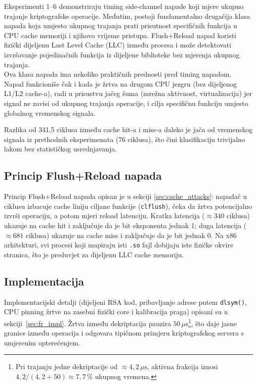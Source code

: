 Eksperimenti 1--6 demonstriraju timing side-channel napade koji mjere ukupno trajanje kriptografske operacije. Međutim, postoji fundamentalno drugačija klasa napada koja umjesto ukupnog trajanja prati prisutnost specifičnih funkcija u CPU cache memoriji i njihovo vrijeme pristupa. Flush+Reload napad \cite{yarom2014} koristi fizički dijeljenu Last Level Cache (LLC) između procesa i može detektovati izvršavanje pojedinačnih funkcija iz dijeljene biblioteke bez mjerenja ukupnog trajanja.
\\

Ova klasa napada ima nekoliko praktičnih prednosti pred timing napadom. Napad funkcioniše čak i kada je žrtva na drugom CPU jezgru (bez dijeljenog L1/L2 cache-a), radi u prisustvu jačeg šuma (mrežna aktivnost, virtualizacija) jer signal ne zavisi od ukupnog trajanja operacije, i cilja specifičnu funkciju umjesto globalnog vremenskog signala.

Razlika od 341{,}5 ciklusa između cache hit-a i miss-a daleko je jača od vremenskog signala iz prethodnih eksperimenata (76 ciklusa), što čini klasifikaciju trivijalno lakom bez statističkog usrednjavanja.

\subsection{Princip Flush+Reload napada}

Princip Flush+Reload napada opisan je u sekciji \ref{sec:cache_attacks}: napadač u ciklusu izbacuje cache liniju ciljane funkcije (\texttt{clflush}), čeka da žrtva potencijalno izvrši operaciju, a potom mjeri reload latenciju. Kratka latencija ($\approx 340$ ciklusa) ukazuje na cache hit i zaključuje da je bit eksponenta jednak 1; duga latencija ($\approx 681$ ciklusa) ukazuje na cache miss i zaključuje da je bit jednak 0. Na x86 arhitekturi, svi procesi koji mapiraju isti \texttt{.so} fajl dobijaju iste fizičke okvire stranica, što je preduvjet za dijeljenu LLC cache memoriju.

\subsection{Implementacija}

Implementacijski detalji (dijeljeni RSA kod, pribavljanje adrese putem \texttt{dlsym()}, CPU pinning žrtve na zasebni fizički core i kalibracija praga) opisani su u sekciji~\ref{sec:fr_impl}. Žrtva između dekriptacija pauzira $50\,\mu\mathrm{s}$\footnote{Pri trajanju jedne dekriptacije od $\approx 4{,}2\,\mu\mathrm{s}$, aktivna frakcija iznosi $4{,}2/(4{,}2+50)\approx 7{,}7\,\%$ ukupnog vremena.}, što daje jasne granice između operacija i odgovara tipičnom primjeru kriptografskog servera s umjerenim opterećenjem.

